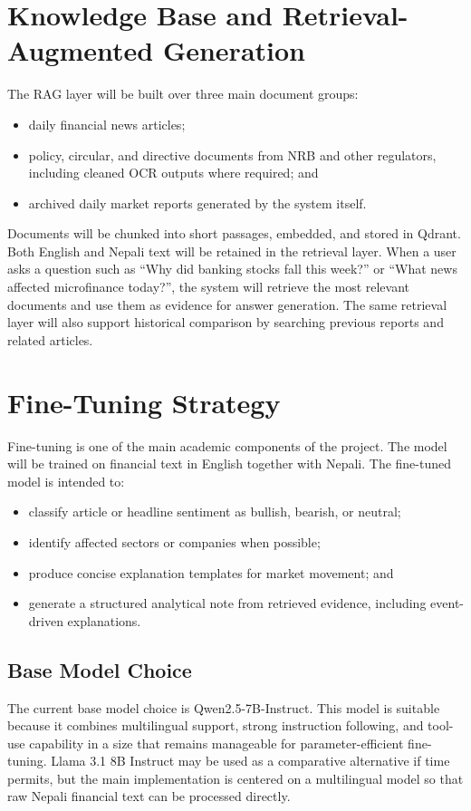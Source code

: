 \documentclass[12pt,a4paper]{report}
\begin{document}
\section{Knowledge Base and Retrieval-Augmented Generation}
The \ac{RAG} layer will be built over three main document groups:
\begin{itemize}[leftmargin=1.6em]
    \item daily financial news articles;
    \item policy, circular, and directive documents from \ac{NRB} and other regulators, including cleaned OCR outputs where required; and
    \item archived daily market reports generated by the system itself.
\end{itemize}

Documents will be chunked into short passages, embedded, and stored in Qdrant. Both English and Nepali text will be retained in the retrieval layer. When a user asks a question such as ``Why did banking stocks fall this week?'' or ``What news affected microfinance today?'', the system will retrieve the most relevant documents and use them as evidence for answer generation. The same retrieval layer will also support historical comparison by searching previous reports and related articles.

\section{Fine-Tuning Strategy}
Fine-tuning is one of the main academic components of the project. The model will be trained on financial text in English together with Nepali. The fine-tuned model is intended to:
\begin{itemize}[leftmargin=1.6em]
    \item classify article or headline sentiment as bullish, bearish, or neutral;
    \item identify affected sectors or companies when possible;
    \item produce concise explanation templates for market movement; and
    \item generate a structured analytical note from retrieved evidence, including event-driven explanations.
\end{itemize}

\subsection{Base Model Choice}
The current base model choice is Qwen2.5-7B-Instruct. This model is suitable because it combines multilingual support, strong instruction following, and tool-use capability in a size that remains manageable for parameter-efficient fine-tuning. Llama 3.1 8B Instruct may be used as a comparative alternative if time permits, but the main implementation is centered on a multilingual model so that raw Nepali financial text can be processed directly.
\end{document}
